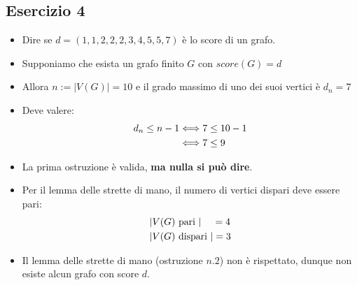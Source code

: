 \documentclass[10pt]{article}
\begin{document}
	\subsection{Esercizio 4}
	\begin{itemize}
	\item
	Dire se $d = (1,1,2,2,2,3,4,5,5,7)$ è lo score di un grafo.
	\item
	Supponiamo che esista un grafo finito $G$ con $score(G) = d$
	\item
	Allora $n := |V(G)| = 10$ e il grado massimo di uno dei suoi vertici è $d_n = 7$
	\item
	Deve valere:
	\begin{equation}
	\begin{split}
		d_n \leq n - 1 &\Longleftrightarrow 7 \leq 10 - 1  \\
		&\Longleftrightarrow 7 \leq 9
		\notag
		\end{split}
	\end{equation}
	\item
	La prima ostruzione è valida, \textbf{ma nulla si può dire}.
	\item
	Per il lemma delle strette di mano, il numero di vertici dispari deve essere pari:
	\begin{equation}
	\begin{split}
		|&V(G) \textrm{ pari }| \quad\, =  4\\
		|&V(G) \textrm{ dispari }| = 3 
		\notag 
		\end{split}
	\end{equation}
	\item
	Il lemma delle strette di mano (ostruzione $n.2$) non è rispettato, dunque non esiste alcun grafo con score $d$.
	\end{itemize}
	
\end{document}
